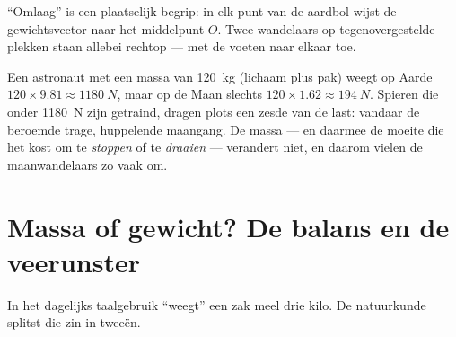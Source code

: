 \begin{omfigure}

{\small ``Omlaag'' is een plaatselijk begrip: in elk punt van de
aardbol wijst de gewichtsvector naar het middelpunt $O$. Twee wandelaars
op tegenovergestelde plekken staan allebei rechtop --- met de voeten naar
elkaar toe.}
\end{omfigure}

\begin{remark}\label{rem:g10:universal-gravitation:bounce}
Een astronaut met een massa van \qty{120}{kg} (lichaam plus pak) weegt op
Aarde $120 \times 9.81 \approx \qty{1180}{N}$, maar op de Maan slechts
$120 \times 1.62 \approx \qty{194}{N}$. Spieren die onder \qty{1180}{N}
zijn getraind, dragen plots een zesde van de last: vandaar de beroemde
trage, huppelende maangang. De massa --- en daarmee de moeite die het
kost om te \emph{stoppen} of te \emph{draaien} --- verandert niet, en
daarom vielen de maanwandelaars zo vaak om.
\end{remark}

\section{Massa of gewicht? De balans en de veerunster}

In het dagelijks taalgebruik ``weegt'' een zak meel drie kilo. De
natuurkunde splitst die zin in tweeën.

